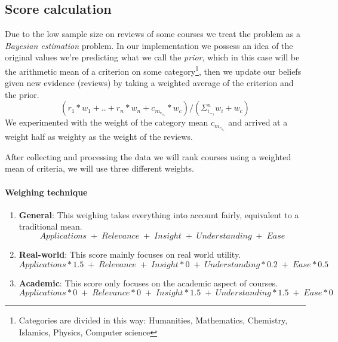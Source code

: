 \documentclass[12pt,a4paper]{article}
\begin{document}
\subsection{Score calculation}
Due to the low sample size on reviews of some courses we treat the problem as a \emph{Bayesian estimation} problem. In our implementation we possess an idea of the original values we're predicting what we call the \emph{prior}, which in this case will be the arithmetic mean of a criterion on some category\footnote{Categories are divided in this way: Humanities, Mathematics, Chemistry, Islamics, Physics, Computer science}, then we  update our beliefs given new evidence (reviews) by taking a weighted average of the criterion and the prior. \[(r_1 * w_1 + .. + r_n * w_n + c{_m_e_a_n} * w_c)/(\Sigma^n_{i_=_1} w_i + w_c)\]
We experimented with the weight of the category mean \(c_{m_e_a_n}\) and arrived at a weight half as weighty as the weight of the reviews.

After collecting and processing the data we will rank courses using a weighted mean of criteria, we will use three different weights.

\paragraph{Weighing technique}
\begin{enumerate}
    \item \textbf{General}: This weighing takes everything into account fairly, equivalent to a traditional mean. \[Applications\; +\; Relevance\; +\; Insight\; +\; Understanding\; +\; Ease\]
    \item \textbf{Real-world}: This score mainly focuses on real world utility. \[Applications * 1.5\; +\; Relevance\; +\; Insight * 0\; +\; Understanding * 0.2\; +\; Ease * 0.5\]
    \item \textbf{Academic}: This score only focuses on the academic aspect of courses. \[Applications * 0\; +\; Relevance * 0\; +\; Insight * 1.5\; +\; Understanding * 1.5\; +\; Ease * 0\]
\end{enumerate}
\end{document}
